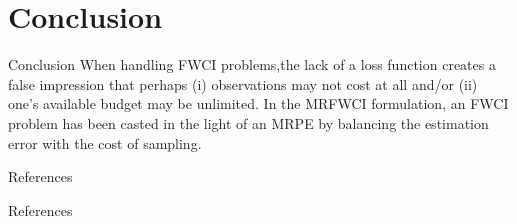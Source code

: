\documentclass [xcolor=svgnames, t] {beamer}
\begin{document}
\section{Conclusion}
\begin{frame}{Conclusion}
\vspace{10mm}
When handling FWCI problems,the lack of a loss function creates a false impression that perhaps 
(i) observations may not cost at all and/or (ii) one's available budget may be unlimited. 
In the MRFWCI formulation, an FWCI problem has been casted in the light of an MRPE by 
balancing the estimation error with the cost of sampling.
\end{frame}

\begin{frame}{References}





\end{frame}
\begin{frame}{References}


\end{frame}
\end{document}
